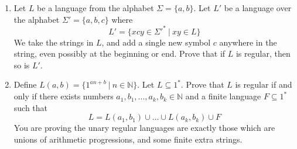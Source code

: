 \documentclass[11pt]{article}
\begin{document}
\begin{enumerate}
\begin{enumerate}
        \item $L_1 = \{1^n ~|~ n \equiv 3 \pmod 4\}$

            \begin{answer}

            \end{answer}
            
        \item $L_2 = \{w \in \Sigma^* ~|~ int(w,2) \equiv 3 \pmod 4\}$

            \begin{answer}
        
            \end{answer}
            
        \item $L_3 = \{w \in \Sigma^* ~|~ int(w,2) \equiv 3 \pmod 5\}$

            \begin{answer}
        
            \end{answer}
            
    \end{enumerate}
    
    \item Let $L$ be a language from the alphabet $\Sigma = \{a,b\}$. Let $L'$ be a language over the alphabet $\Sigma' = \{a,b,c\}$ where $$L' = \{xcy \in \Sigma'^*~|~ xy \in L\}$$ We take the strings in $L$, and add a single new symbol $c$ anywhere in the string, even possibly at the beginning or end. Prove that if $L$ is regular, then so is $L'$.
        
        \begin{answer}
            
        \end{answer}
        
    \item Define $L(a,b) = \{1^{an + b}~|~ n \in \mathbb{N}\}$. Let $L \subseteq 1^*$. Prove that $L$ is regular if and only if there exists numbers $a_1,b_1,...,a_k,b_k \in \mathbb{N}$ and a finite language $F\subseteq 1^*$ such that $$L = L(a_1,b_1) \cup ... \cup L(a_k,b_k) \cup F$$ You are proving the unary regular languages are exactly those which are unions of arithmetic progressions, and some finite extra strings.
        
        \begin{answer}
        
        \end{answer}
        
\end{enumerate}
\end{document}

